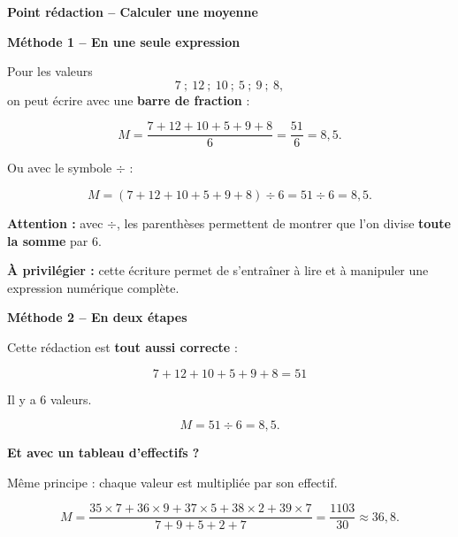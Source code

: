 \documentclass[12pt,a4paper]{article}
\begin{document}
\begin{center}
  {\sffamily\LARGE\bfseries\color{TitreC}
  Point rédaction -- Calculer une moyenne}
\end{center}

\vspace{-0.25em}


\begin{tcolorbox}[
  mathsbox,
  colback=SavoirBg,
  colframe=SavoirC,
  boxrule=0.7pt,
  arc=2mm,
  left=3mm,
  right=3mm,
  top=2mm,
  bottom=2mm
]
{\sffamily\bfseries\color{SavoirC}
Méthode 1 -- En une seule expression}

\smallskip

Pour les valeurs
\[
7 \ ;\ 12 \ ;\ 10 \ ;\ 5 \ ;\ 9 \ ;\ 8,
\]
on peut écrire avec une \textbf{barre de fraction} :

\[
M=
\frac{7+12+10+5+9+8}{6}
=
\frac{51}{6}
=
8{,}5.
\]

Ou avec le symbole \(\div\) :

\[
M=
(7+12+10+5+9+8)\div 6
=
51\div 6
=
8{,}5.
\]

\textbf{Attention :} avec \(\div\), les parenthèses permettent de montrer
que l'on divise \textbf{toute la somme} par \(6\).

\medskip
\textbf{À privilégier :} cette écriture permet de s'entraîner à lire
et à manipuler une expression numérique complète.
\end{tcolorbox}

\begin{tcolorbox}[
  mathsbox,
  colback=NeutreBg,
  colframe=NeutreC!55,
  boxrule=0.6pt,
  arc=2mm,
  left=3mm,
  right=3mm,
  top=2mm,
  bottom=2mm
]
{\sffamily\bfseries\color{NeutreC}
Méthode 2 -- En deux étapes}

\smallskip

Cette rédaction est \textbf{tout aussi correcte} :

\[
7+12+10+5+9+8=51
\]

Il y a \(6\) valeurs.

\[
M=51\div 6=8{,}5.
\]

\end{tcolorbox}

\begin{tcolorbox}[
  mathsbox,
  colback=ActionBg,
  colframe=ActionC,
  boxrule=0.7pt,
  arc=2mm,
  left=3mm,
  right=3mm,
  top=2mm,
  bottom=2mm
]
{\sffamily\bfseries\color{ActionC}
Et avec un tableau d'effectifs ?}

\smallskip

Même principe : chaque valeur est multipliée par son effectif.

\[
M=
\frac{35\times7+36\times9+37\times5+38\times2+39\times7}
     {7+9+5+2+7}
=
\frac{1103}{30}
\approx
36{,}8.
\]

\end{tcolorbox}
\end{document}
